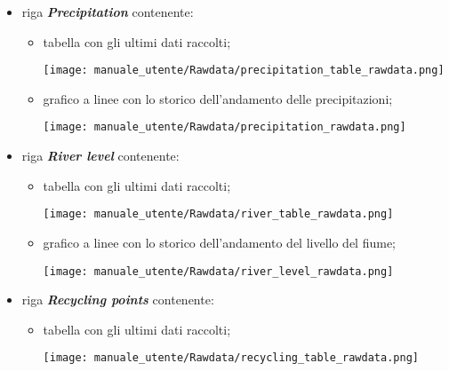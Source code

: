 \begin{itemize}
    \item riga \textit{\textbf{Precipitation}} contenente:
    \begin{itemize}
        \item tabella con gli ultimi dati raccolti;
        \begin{center}
            \texttt{[image: manuale\_utente/Rawdata/precipitation\_table\_rawdata.png]}
        \end{center}
        \item grafico a linee con lo storico dell'andamento delle precipitazioni;
        \begin{center}
            \texttt{[image: manuale\_utente/Rawdata/precipitation\_rawdata.png]}
        \end{center}
    \end{itemize}
    \item riga \textit{\textbf{River level}} contenente:
    \begin{itemize}
        \item tabella con gli ultimi dati raccolti;
        \begin{center}
            \texttt{[image: manuale\_utente/Rawdata/river\_table\_rawdata.png]}
        \end{center}
        \item grafico a linee con lo storico dell'andamento del livello del fiume;
        \begin{center}
            \texttt{[image: manuale\_utente/Rawdata/river\_level\_rawdata.png]}
        \end{center}
    \end{itemize}
    \item riga \textit{\textbf{Recycling points}} contenente:
    \begin{itemize}
        \item tabella con gli ultimi dati raccolti;
        \begin{center}
            \texttt{[image: manuale\_utente/Rawdata/recycling\_table\_rawdata.png]}
        \end{center}

\end{itemize}
\end{itemize}
